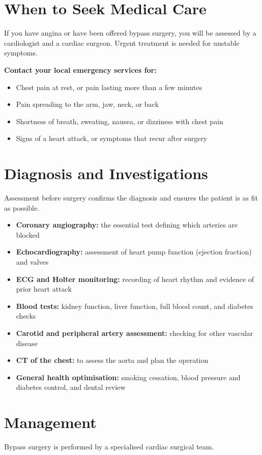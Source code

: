 \section*{When to Seek Medical Care}
If you have angina or have been offered bypass surgery, you will be assessed by a cardiologist and a cardiac surgeon. Urgent treatment is needed for unstable symptoms.

\textbf{Contact your local emergency services for:}
\begin{itemize}
    \item Chest pain at rest, or pain lasting more than a few minutes
    \item Pain spreading to the arm, jaw, neck, or back
    \item Shortness of breath, sweating, nausea, or dizziness with chest pain
    \item Signs of a heart attack, or symptoms that recur after surgery
\end{itemize}

\section*{Diagnosis and Investigations}
Assessment before surgery confirms the diagnosis and ensures the patient is as fit as possible.

\begin{itemize}
    \item \textbf{Coronary angiography:} the essential test defining which arteries are blocked
    \item \textbf{Echocardiography:} assessment of heart pump function (ejection fraction) and valves
    \item \textbf{ECG and Holter monitoring:} recording of heart rhythm and evidence of prior heart attack
    \item \textbf{Blood tests:} kidney function, liver function, full blood count, and diabetes checks
    \item \textbf{Carotid and peripheral artery assessment:} checking for other vascular disease
    \item \textbf{CT of the chest:} to assess the aorta and plan the operation
    \item \textbf{General health optimisation:} smoking cessation, blood pressure and diabetes control, and dental review
\end{itemize}

\section*{Management}
Bypass surgery is performed by a specialised cardiac surgical team.

